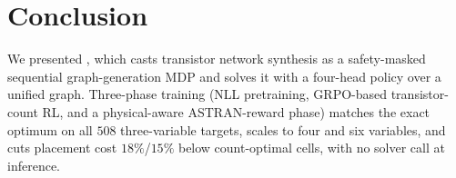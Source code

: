 \section{Conclusion}
\label{sec:con}

We presented \method, which casts transistor network synthesis as a
safety-masked sequential graph-generation MDP and solves it with a four-head
policy over a unified graph.  Three-phase training (NLL pretraining, GRPO-based transistor-count RL,
and a physical-aware ASTRAN-reward phase) matches the exact optimum on all
$508$ three-variable targets, scales to four and six variables, and cuts
placement cost $18\%$/$15\%$ below count-optimal cells, with no solver call at
inference.
